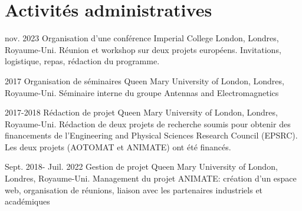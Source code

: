 \documentclass{cv}
\begin{document}
\section{Activités administratives}

\begin{entrylist}

	\entry
	{nov. 2023}
	{Organisation d'une conférence}
	{Imperial College London, Londres, Royaume-Uni.}
	{Réunion et workshop sur deux projets européens. Invitations, logistique, repas, rédaction du programme.}

	\entry
	{2017}
	{Organisation de séminaires}
	{Queen Mary University of London, Londres, Royaume-Uni.}
	{
		Séminaire interne du groupe Antennas and Electromagnetics}

	\entry
	{2017-2018}
	{Rédaction de projet}
	{Queen Mary University of London, Londres, Royaume-Uni.}
	{
		Rédaction de deux projets de recherche soumis pour obtenir des financements
		de l'Engineering and Physical Sciences Research Council (EPSRC). Les deux projets (AOTOMAT et ANIMATE) ont été
		financés.}

	\entry
	{Sept. 2018- Juil. 2022}
	{Gestion de projet}
	{Queen Mary University of London, Londres, Royaume-Uni.}
	{
		Management du projet ANIMATE: création d'un espace web, organisation de réunions,
		liaison avec les partenaires industriels et académiques}


\end{entrylist}




\end{document}
